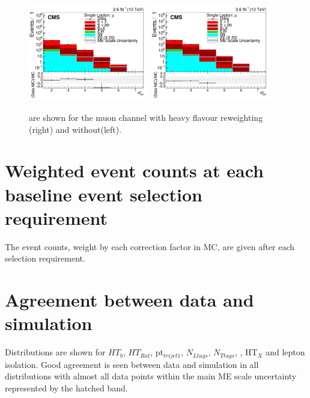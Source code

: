 \begin{figure}[ht!]
    \includegraphics[width=0.47\textwidth]{images/Run2/nMtags_StackLogY_HF_wo_reweight.pdf} 
    \includegraphics[width=0.47\textwidth]{images/Run2/nMtags_StackLogY_HF_w_reweight.pdf} 
    \caption{\nMtags are shown for the muon channel with heavy flavour reweighting (right) and without(left).}
    \label{fig:HF_reweight}
\end{figure}

\clearpage

\section{Weighted event counts at each baseline event selection requirement \label{cutflow13}}

The event counts, weight by each correction factor in MC, are given after each selection requirement.

\section{Agreement between data and simulation}
Distributions are shown for $HT_{b}$, $HT_{Rat}$, pt$_{trijet1}$, $N_{Ltags}$, $N_{Ttags}$, \redhadmass, HT$_{X}$ and lepton isolation. Good agreement is seen between data and simulation in all distributions with almost all data points within the main ME scale uncertainty represented by the hatched band.

